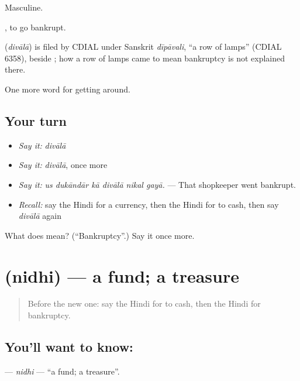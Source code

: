 Masculine.

 , to go bankrupt.

\begin{cousinweb}
\textbf{} (\emph{divālā}) is filed by CDIAL under Sanskrit \emph{dīpāvali}, \textquotedblleft{}a row of lamps\textquotedblright{} (CDIAL 6358), beside ; how a row of lamps came to mean bankruptcy is not explained there.
\end{cousinweb}

\begin{grammarlens}[title={What you've built}]
One more word for getting around.
\end{grammarlens}

\subsection*{Your turn}
\begin{itemize}
\raggedright
  \item \emph{Say it:} \emph{divālā}
  \item \emph{Say it:} \emph{divālā}, once more
  \item \emph{Say it:} \emph{us dukāndār kā divālā nikal gayā.} — That shopkeeper went bankrupt.
  \item \emph{Recall:} say the Hindi for a currency, then the Hindi for to cash, then say \emph{divālā} again
\end{itemize}

\begin{tcolorbox}[breakable,colback=teal!4,colframe=teal!35!black,title={Before you move on}]
What does  mean? (\textquotedblleft{}Bankruptcy\textquotedblright{}.) Say it once more.
\end{tcolorbox}
\section[\texorpdfstring{\hi{निधि} (nidhi)}{निधि (nidhi)}]{ (nidhi) — a fund; a treasure}

\label{lesson:HI-C430-nidhi}



\begin{quote}
Before the new one: say the Hindi for to cash, then the Hindi for bankruptcy.
\end{quote}

\subsection*{You'll want to know: }
\textbf{} — \emph{nidhi} — \textquotedblleft{}a fund; a treasure\textquotedblright{}.

